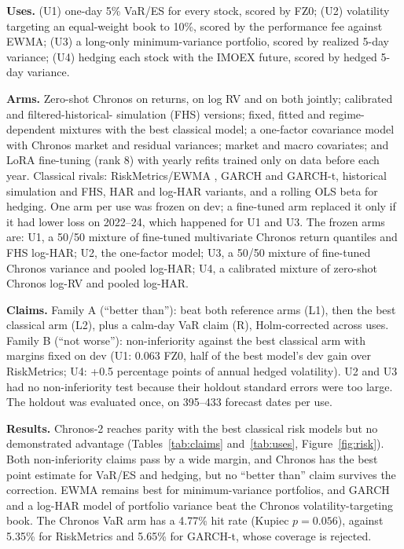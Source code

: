 \documentclass[11pt]{article}
\begin{document}
\textbf{Uses.} (U1) one-day 5\% VaR/ES for every stock, scored by FZ0; (U2) volatility targeting an equal-weight
book to 10\%, scored by the performance fee against EWMA; (U3) a long-only minimum-variance portfolio, scored by
realized 5-day variance; (U4) hedging each stock with the IMOEX future, scored by hedged 5-day variance.

\textbf{Arms.} Zero-shot Chronos on returns, on log RV and on both jointly; calibrated and filtered-historical-
simulation (FHS) \citep{baroneadesi1999var} versions; fixed, fitted and regime-dependent mixtures with the best
classical model; a one-factor covariance model with Chronos market and residual variances; market and macro
covariates; and LoRA \citep{hu2022lora} fine-tuning (rank 8) with yearly refits trained only on data before each
year. Classical rivals: RiskMetrics/EWMA \citep{riskmetrics1996}, GARCH and GARCH-t, historical simulation and FHS,
HAR and log-HAR variants, and a rolling OLS beta for hedging. One arm per use was frozen on dev; a fine-tuned arm
replaced it only if it had lower loss on 2022--24, which happened for U1 and U3. The frozen arms are: U1, a
50/50 mixture of fine-tuned multivariate Chronos return quantiles and FHS log-HAR; U2, the one-factor model;
U3, a 50/50 mixture of fine-tuned Chronos variance and pooled log-HAR; U4, a calibrated mixture of zero-shot
Chronos log-RV and pooled log-HAR.

\textbf{Claims.} Family A (``better than''): beat both reference arms (L1), then the best classical arm (L2), plus
a calm-day VaR claim (R), Holm-corrected across uses. Family B (``not worse''): non-inferiority against the best
classical arm with margins fixed on dev (U1: 0.063 FZ0, half of the best model's dev gain over RiskMetrics; U4:
+0.5 percentage points of annual hedged volatility). U2 and U3 had no non-inferiority test because their holdout
standard errors were too large. The holdout was evaluated once, on 395--433 forecast dates per use.

\textbf{Results.} Chronos-2 reaches parity with the best classical risk models but no demonstrated advantage
(Tables~\ref{tab:claims} and~\ref{tab:uses}, Figure~\ref{fig:risk}). Both non-inferiority claims pass by a wide
margin, and Chronos has the best point estimate for VaR/ES and hedging, but no ``better than'' claim survives the
correction. EWMA remains best for minimum-variance portfolios, and GARCH and a log-HAR model of portfolio
variance beat the Chronos volatility-targeting book. The Chronos VaR arm has a 4.77\% hit rate (Kupiec
$p = 0.056$), against 5.35\% for RiskMetrics and 5.65\% for GARCH-t, whose coverage is rejected.
\end{document}
